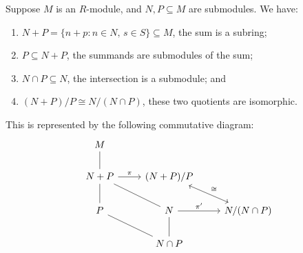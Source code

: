\begin{theorem}\label{thm:iso-2-mod}
    Suppose \(M\) is an \(R\)-module,
    and \(N,P \subseteq M\) are submodules.
    We have:
    \begin{enumerate}[label={(\alph*)}, itemsep=0mm]
        \item \(N+P = \{n+p: n \in N,\, s \in S\} \subseteq M\), the sum is a subring;
        \item \(P \subseteq N+P\), the summands are submodules of the sum;
        \item \(N \cap P \subseteq N\), the intersection is a submodule; and
        \item \((N+P)/P \cong N/(N \cap P)\), these two quotients are isomorphic.
    \end{enumerate}

    This is represented by the following commutative diagram:
    \begin{equation*}
        \begin{tikzcd}
            M \arrow[dash]{d} \\
            N+P \arrow[dash]{d} \arrow{r}{\pi} \arrow[dash]{rd} &
            (N+P)/P \arrow[leftrightarrow]{rd}{\cong} \\
            P \arrow[dash]{rd} & N \arrow{r}{\pi'} \arrow[dash]{d} &
            N/(N \cap P) \\
            & N \cap P
        \end{tikzcd}
    \end{equation*}
\end{theorem}

